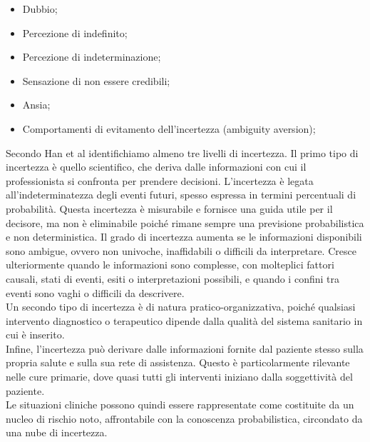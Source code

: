 \begin{itemize}
    \item Dubbio;
    \item Percezione di indefinito;
    \item Percezione di indeterminazione;
    \item Sensazione di non essere credibili;
    \item Ansia;
    \item Comportamenti di evitamento dell'incertezza (ambiguity aversion);
\end{itemize}

\noindent Secondo Han et al identifichiamo almeno tre livelli di incertezza. Il primo tipo di incertezza è quello scientifico, che deriva dalle informazioni con cui il professionista si confronta per prendere decisioni. L'incertezza è legata all'indeterminatezza degli eventi futuri, spesso espressa in termini percentuali di probabilità. Questa incertezza è misurabile e fornisce una guida utile per il decisore, ma non è eliminabile poiché rimane sempre una previsione probabilistica e non deterministica. Il grado di incertezza aumenta se le informazioni disponibili sono ambigue, ovvero non univoche, inaffidabili o difficili da interpretare. Cresce ulteriormente quando le informazioni sono complesse, con molteplici fattori causali, stati di eventi, esiti o interpretazioni possibili, e quando i confini tra eventi sono vaghi o difficili da descrivere.\\
Un secondo tipo di incertezza è di natura pratico-organizzativa, poiché qualsiasi intervento diagnostico o terapeutico dipende dalla qualità del sistema sanitario in cui è inserito.\\ 
Infine, l'incertezza può derivare dalle informazioni fornite dal paziente stesso sulla propria salute e sulla sua rete di assistenza. Questo è particolarmente rilevante nelle cure primarie, dove quasi tutti gli interventi iniziano dalla soggettività del paziente.\\

Le situazioni cliniche possono quindi essere rappresentate come costituite da un nucleo di rischio noto, affrontabile con la conoscenza probabilistica, circondato da una nube di incertezza.\\

